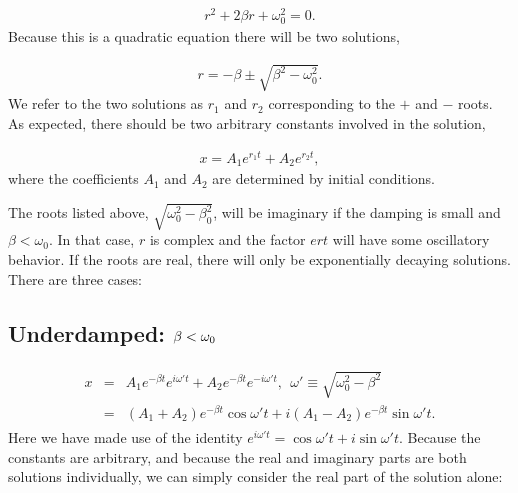 \documentclass[letterpaper,10pt,english]{sphinxmanual}
\begin{document}
\begin{equation*}
\begin{split}
\begin{equation}
r^2+2\beta r+\omega_0^2=0.
\label{_auto41} \tag{52}
\end{equation}
\end{split}
\end{equation*}
Because this is a quadratic equation there will be two solutions,




\begin{equation*}
\begin{split}
\begin{equation}
r=-\beta\pm\sqrt{\beta^2-\omega_0^2}.
\label{_auto42} \tag{53}
\end{equation}
\end{split}
\end{equation*}
We refer to the two solutions as \(r_1\) and \(r_2\) corresponding to the
\(+\) and \(-\) roots. As expected, there should be two arbitrary
constants involved in the solution,




\begin{equation*}
\begin{split}
\begin{equation}
x=A_1e^{r_1t}+A_2e^{r_2t},
\label{_auto43} \tag{54}
\end{equation}
\end{split}
\end{equation*}
where the coefficients \(A_1\) and \(A_2\) are determined by initial
conditions.

The roots listed above, \(\sqrt{\omega_0^2-\beta_0^2}\), will be
imaginary if the damping is small and \(\beta<\omega_0\). In that case,
\(r\) is complex and the factor \(e{rt}\) will have some oscillatory
behavior. If the roots are real, there will only be exponentially
decaying solutions. There are three cases:


\subsection{Underdamped: \protect\(\beta<\omega_0\protect\)}
\label{\detokenize{chapter1:underdamped-beta-omega-0}}\begin{equation*}
\begin{split}
\begin{eqnarray}
x&=&A_1e^{-\beta t}e^{i\omega't}+A_2e^{-\beta t}e^{-i\omega't},~~\omega'\equiv\sqrt{\omega_0^2-\beta^2}\\
\nonumber
&=&(A_1+A_2)e^{-\beta t}\cos\omega't+i(A_1-A_2)e^{-\beta t}\sin\omega't.
\end{eqnarray}
\end{split}
\end{equation*}
Here we have made use of the identity
\(e^{i\omega't}=\cos\omega't+i\sin\omega't\). Because the constants are
arbitrary, and because the real and imaginary parts are both solutions
individually, we can simply consider the real part of the solution
alone:
\end{document}
